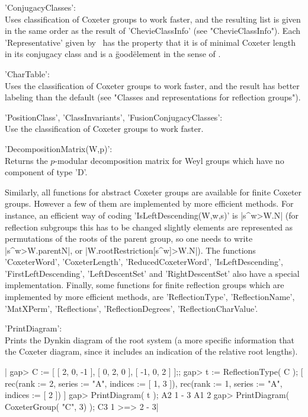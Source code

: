 'ConjugacyClasses':\\   Uses  classification of  Coxeter  groups  to work
     faster,  and the  resulting  list is  given in  the  same order  as
     the  result  of  'ChevieClassInfo'  (see  "ChevieClassInfo").  Each
     'Representative' given by  \CHEVIE\ has the property that  it is of
     minimal Coxeter  length in  its conjugacy class  and is  a \"good\"
     element in the sense of \cite{GM97}.

'CharTable':\\ Uses the classification of  Coxeter groups to work faster,
     and   the result has better  labeling  than the default (see
     "Classes and representations for reflection groups").

'PositionClass',  'ClassInvariants', 'FusionConjugacyClasses':\\ Use  the
     classification     of    Coxeter   groups     to    work     faster.

'DecompositionMatrix(W,p)':\\  Returns the $p$-modular decomposition matrix
for Weyl groups which have no component of type 'D'.

Similarly,  all  functions  for  abstract  Coxeter groups are available for
finite  Coxeter  groups.  However  a  few  of  them are implemented by more
efficient methods. For instance, an efficient way of coding
'IsLeftDescending(W,w,s)'  is |s^w>W.N| (for  reflection subgroups this has
to  be changed slightly\:  elements are represented  as permutations of the
roots  of  the  parent  group,  so  one  needs to write |s^w>W.parentN|, or
|W.rootRestriction[s^w]>W.N|). The functions 'CoxeterWord',
'CoxeterLength', 'ReducedCoxeterWord', 'IsLeftDescending',
'FirstLeftDescending',  'LeftDescentSet' and 'RightDescentSet'  also have a
special  implementation.  Finally,  some  functions  for  finite reflection
groups which are implemented by more efficient methods, are
'ReflectionType',      'ReflectionName',     'MatXPerm',     'Reflections',
'ReflectionDegrees', 'ReflectionCharValue'.

'PrintDiagram':\\ Prints the Dynkin diagram of the root system (a more
  specific  information  that  the  Coxeter  diagram,  since it includes an
  indication of the relative root lengths).

|    gap> C := [ [ 2, 0, -1 ], [ 0, 2, 0 ], [ -1, 0, 2 ] ];;
    gap> t := ReflectionType( C );
    [ rec(rank    := 2,
      series  := "A",
      indices := [ 1, 3 ]), rec(rank    := 1,
      series  := "A",
      indices := [ 2 ]) ]
    gap> PrintDiagram( t );
    A2    1 - 3
    A1    2
    gap> PrintDiagram( CoxeterGroup( "C", 3) );
    C3 1 >=> 2 - 3|


